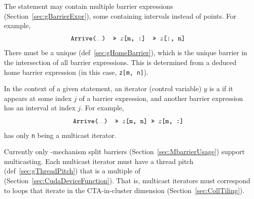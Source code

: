 

The  statement may contain multiple barrier expressions (Section~\ref{sec:gBarrierExpr}), some containing intervals instead of points.
For example,
\begin{equation*}
    \texttt{Arrive(\codecomment{...}) >> $z$[m, :] >> $z$[:, n]}
\end{equation*}
There must be a unique  (def~\ref{sec:gHomeBarrier}), which is the unique barrier in the intersection of all barrier expressions.
This is determined from a deduced home barrier expression (in this case, \texttt{z[m, n]}).

In the context of a given  statement, an iterator (control variable) $y$ is a  if it appears at some index $j$ of a barrier expression, and another barrier expression has an interval at index $j$.
For example,
\begin{equation*}
    \texttt{Arrive(\codecomment{...}) >> $z$[m, n] >> $z$[m, :]}
\end{equation*}
has only \texttt{n} being a multicast iterator.

Currently only -mechanism split barriers (Section~\ref{sec:MbarrierUsage}) support multicasting.
Each multicast iterator must have a thread pitch (def~\ref{sec:gThreadPitch}) that is a multiple of  (Section~\ref{sec:CudaDeviceFunction}).
That is, multicast iterators must correspond to  loops that iterate in the CTA-in-cluster dimension (Section~\ref{sec:CollTiling}).

